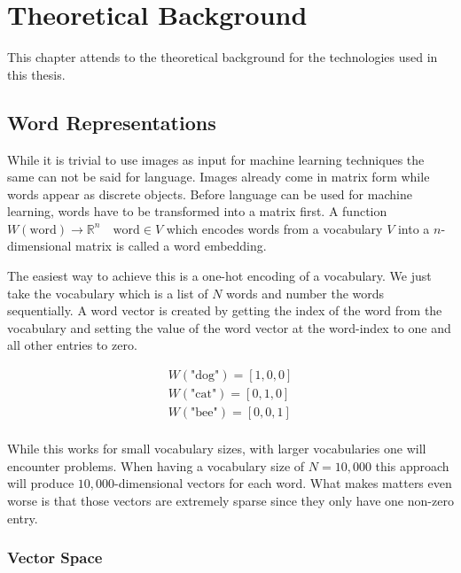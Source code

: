 \chapter{Theoretical Background}
\label{ch:theory}

This chapter attends to the theoretical background for the technologies used in this thesis.

\section{Word Representations}

While it is trivial to use images as input for machine learning techniques the same can not be said for language. Images already come in matrix form while words appear as discrete objects. Before language can be used for machine learning, words have to be transformed into a matrix first. A function $W(\text{word}) \rightarrow \mathbb{R}^n \quad \text{word} \in V$  which encodes words from a vocabulary $V$ into a $n$-dimensional matrix is called a word embedding.
\medskip

The easiest way to achieve this is a one-hot encoding of a vocabulary. We just take the vocabulary which is a list of $N$ words and number the words sequentially. A word vector is created by getting the index of the word from the vocabulary and setting the value of the word vector at the word-index to one and all other entries to zero.

\begin{equation*}
	\begin{aligned}
		W(\text{"dog"}) = [1, 0, 0] \\
		W(\text{"cat"}) = [0, 1, 0] \\
		W(\text{"bee"}) = [0, 0, 1] \\
	\end{aligned}
\end{equation*}


While this works for small vocabulary sizes, with larger vocabularies one will encounter problems. When having a vocabulary size of $N=10,000$ this approach will produce $10,000$-dimensional vectors for each word. What makes matters even worse is that those vectors are extremely sparse since they only have one non-zero entry.
\medskip

\subsection{Vector Space}
\label{sec:03_vectorSpace}

